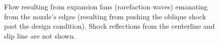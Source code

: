 \documentclass[11pt,dvipsnames]{thesis}
\begin{document}
\begin{figure}[H]
\caption{Flow resulting from expansion fans (rarefaction waves) emanating from the nozzle's edges (resulting from pushing the oblique shock past the design condition). Shock reflections from the centerline and slip line are not shown.}
\end{figure}
\end{document}
